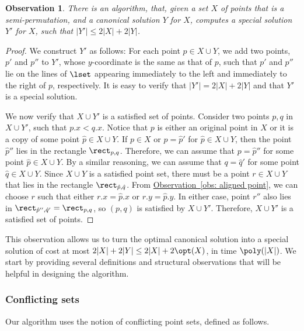 \documentclass[11pt]{article}
\numberwithin{equation}{section}
\theoremstyle{definition}
\theoremstyle{plain}
\newcommand{\expref}[2]{\hyperref[#2]{#1~\ref{#2}}}
\newtheorem{myobs}[theorem]{Observation}
\begin{document}
\begin{myobs}
        \label{obs: canonical to special} 
        There is an algorithm, that, given a set $X$ of points that is a semi-permutation, and a canonical solution $Y$ for $X$, computes a special solution $Y'$ for $X$, such that $|Y'| \leq 2 |X| + 2 |Y|$. 
\end{myobs}
\begin{proof}
We construct $Y'$ as follows: For each point $p \in X \cup Y$, we add two points, $p'$ and $p''$ to $Y'$, whose $y$-coordinate is the same as that of $p$, such that $p'$ and $p''$ lie on the lines of $\lset$ appearing immediately to the left and immediately to the right of $p$, respectively. %
                It is easy to verify that $|Y'|=2|X|+2|Y|$ and that $Y'$ is a special solution. 
        
        We now verify that $X \cup Y'$ is a satisfied set of points. 
        Consider two points $p,q$ in $X \cup Y'$, such that $p.x < q.x$. Notice that $p$ is either an original point in $X$ or it is a copy of some point $\hat p\in X \cup Y$. 
        If $p \in X$ or $p = \hat p'$ for $\hat p \in X \cup Y$, then the point $\hat p''$ lies in the rectangle $\rect_{p,q}$. Therefore, we can assume that $p=\hat p''$ for some point $\hat p\in X\cup Y$.
        By a similar reasoning, we can assume that $q=\hat q'$ for some point $\hat q\in X\cup Y$. Since $X\cup Y$ is a satisfied point set, there must be a point $r\in X\cup Y$ that lies in the rectangle $\rect_{\hat p,\hat q}$. From \expref{Observation}{obs: aligned point}, we can choose $r$ such that either $r.x=\hat p.x$ or $r.y=\hat p.y$. In either case, point $r''$ also lies in $\rect_{\hat p'',\hat q'}=\rect_{p,q}$, so $(p,q)$ is satisfied by $X\cup Y'$. %
        Therefore, $X\cup Y'$ is a satisfied set of points. 
\end{proof}



This observation allows us to turn the optimal canonical solution into a special solution of cost at most $2|X|+2|Y|\leq 2|X|+2\opt(X)$, in time $\poly(|X|)$. 
We start by providing several definitions and structural observations that will be helpful in designing the algorithm.

\subsubsection{Conflicting sets} 

Our algorithm uses the notion of conflicting point sets, defined as follows.
\end{document}
